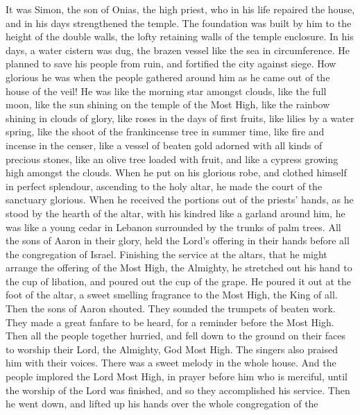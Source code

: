  It was Simon, the son of Onias, the high priest, who in his
life repaired the house, and in his days strengthened the temple.
 The foundation was built by him to the height of the double
walls, the lofty retaining walls of the temple enclosure. 
In his days, a water cistern was dug, the brazen vessel like the sea in
circumference.  He planned to save his people from ruin, and
fortified the city against siege.  How glorious he was when
the people gathered around him as he came out of the house of the veil!
 He was like the morning star amongst clouds, like the full
moon,  like the sun shining on the temple of the Most High,
like the rainbow shining in clouds of glory,  like roses in
the days of first fruits, like lilies by a water spring, like the shoot
of the frankincense tree in summer time,  like fire and
incense in the censer, like a vessel of beaten gold adorned with all
kinds of precious stones,  like an olive tree loaded with
fruit, and like a cypress growing high amongst the clouds. 
When he put on his glorious robe, and clothed himself in perfect
splendour, ascending to the holy altar, he made the court of the
sanctuary glorious.  When he received the portions out of
the priests' hands, as he stood by the hearth of the altar, with his
kindred like a garland around him, he was like a young cedar in Lebanon
surrounded by the trunks of palm trees.  All the sons of
Aaron in their glory, held the Lord's offering in their hands before all
the congregation of Israel.  Finishing the service at the
altars, that he might arrange the offering of the Most High, the
Almighty,  he stretched out his hand to the cup of
libation, and poured out the cup of the grape. He poured it out at the
foot of the altar, a sweet smelling fragrance to the Most High, the King
of all.  Then the sons of Aaron shouted. They sounded the
trumpets of beaten work. They made a great fanfare to be heard, for a
reminder before the Most High.  Then all the people
together hurried, and fell down to the ground on their faces to worship
their Lord, the Almighty, God Most High.  The singers also
praised him with their voices. There was a sweet melody in the whole
house.  And the people implored the Lord Most High, in
prayer before him who is merciful, until the worship of the Lord was
finished, and so they accomplished his service.  Then he
went down, and lifted up his hands over the whole congregation of the

